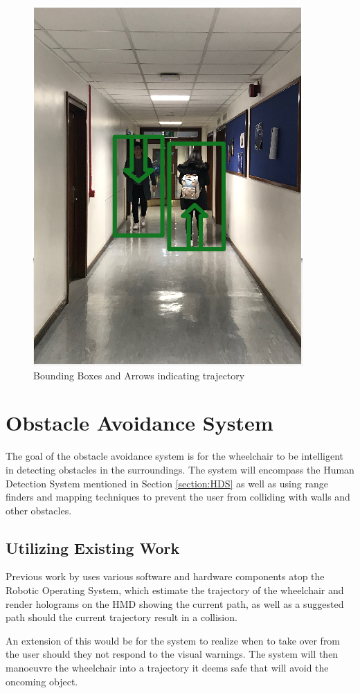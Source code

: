 \documentclass[12pt,a4paper]{report}
\begin{document}
\begin{figure}[ht!]
	\begin{center}
		\includegraphics[width=.5\linewidth]{Images/Implementation/HMD_Trajectory_Hologram.png}
		\caption{Bounding Boxes and Arrows indicating trajectory}
		\label{fig:HMD_Trajectory_Mockup}
	\end{center}
\end{figure}


\section{Obstacle Avoidance System} \label{section:OAS}
The goal of the obstacle avoidance system is for the wheelchair to be intelligent in detecting obstacles in the surroundings. The system will encompass the Human Detection System mentioned in Section \ref{section:HDS} as well as using range finders and mapping techniques to prevent the user from colliding with walls and other obstacles.

\subsection{Utilizing Existing Work}
Previous work by \cite{Zolotas2018} uses various software and hardware components atop the Robotic Operating System, which estimate the trajectory of the wheelchair and render holograms on the HMD showing the current path, as well as a suggested path should the current trajectory result in a collision.

An extension of this would be for the system to realize when to take over from the user should they not respond to the visual warnings. The system will then manoeuvre the wheelchair into a trajectory it deems safe that will avoid the oncoming object.
\end{document}
